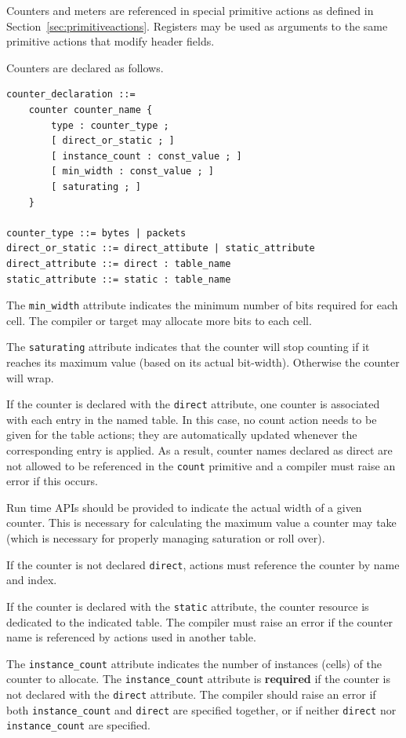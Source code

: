 \documentclass[12pt]{article}
\begin{document}
Counters and meters are referenced in special primitive actions as defined 
in Section~\ref{sec:primitiveactions}. Registers may be used as arguments to 
the same primitive actions that modify header fields.


Counters are declared as follows.

\begin{lstlisting}[style=BNFstyle]
counter_declaration ::=
    counter counter_name { 
        type : counter_type ;
        [ direct_or_static ; ]
        [ instance_count : const_value ; ]
        [ min_width : const_value ; ]
        [ saturating ; ]
    }

counter_type ::= bytes | packets
direct_or_static ::= direct_attibute | static_attribute
direct_attribute ::= direct : table_name
static_attribute ::= static : table_name
\end{lstlisting}


The \texttt{min_width} attribute indicates the minimum number of bits
required for each cell.  The compiler or target may allocate more bits
to each cell.

The \texttt{saturating} attribute indicates that the counter will stop
counting if it reaches its maximum value (based on its actual
bit-width). Otherwise the counter will wrap.

If the counter is declared with the \texttt{direct} attribute, one
counter is associated with each entry in the named table. In this
case, no count action needs to be given for the table actions; they
are automatically updated whenever the corresponding entry is
applied. As a result, counter names declared as direct are not allowed
to be referenced in the \texttt{count} primitive and a compiler must
raise an error if this occurs.

Run time APIs should be provided to indicate the actual width of a
given counter.  This is necessary for calculating the maximum value a
counter may take (which is necessary for properly managing saturation
or roll over).

If the counter is not declared \texttt{direct}, actions must reference
the counter by name and index.

If the counter is declared with the \texttt{static} attribute, the
counter resource is dedicated to the indicated table. The compiler
must raise an error if the counter name is referenced by actions used
in another table.

The \texttt{instance_count} attribute indicates the number of
instances (cells) of the counter to allocate. The
\texttt{instance_count} attribute is \textbf{required} if the counter
is not declared with the \texttt{direct} attribute.  The compiler
should raise an error if both \texttt{instance_count} and
\texttt{direct} are specified together, or if neither \texttt{direct}
nor \texttt{instance_count} are specified.  
\end{document}
